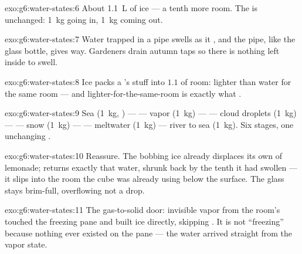 \begin{solution}{exo:g6:water-states:6}
About \qty{1.1}{L} of ice --- a tenth more room. The  is
unchanged: \qty{1}{kg} going in, \qty{1}{kg} coming out.
\end{solution}

\begin{solution}{exo:g6:water-states:7}
Water trapped in a pipe swells as it , and the pipe, like
the glass bottle, gives way. Gardeners drain autumn taps so there
is nothing left inside to swell.
\end{solution}

\begin{solution}{exo:g6:water-states:8}
Ice packs a 's stuff into $1.1$  of room: lighter than
water for the same room --- and lighter-for-the-same-room is
exactly what .
\end{solution}

\begin{solution}{exo:g6:water-states:9}
Sea (\qty{1}{kg}, ) ---  --- vapor
(\qty{1}{kg}) ---  --- cloud droplets (\qty{1}{kg})
---  --- snow (\qty{1}{kg}) ---  ---
meltwater (\qty{1}{kg}) --- river to sea (\qty{1}{kg}). Six
stages, one unchanging .
\end{solution}

\begin{solution}{exo:g6:water-states:10}
Reassure. The bobbing ice already displaces its own \emph{}
of lemonade;  returns exactly that water, shrunk back by
the tenth it had swollen --- it slips into the room the cube was
already using below the surface. The glass stays brim-full,
overflowing not a drop.
\end{solution}

\begin{solution}{exo:g6:water-states:11}
The gas-to-solid door: invisible vapor from the room's  touched
the freezing pane and built ice directly, skipping . It is
not ``freezing'' because nothing  ever existed on the pane
--- the water arrived straight from the vapor state.
\end{solution}


